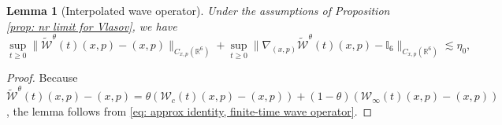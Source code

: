 \documentclass[reqno, 11pt, letterpaper]{amsart}
\newtheorem{lemma}[theorem]{Lemma}
\theoremstyle{remark}
\numberwithin{equation}{section}
\numberwithin{theorem}{section}
\numberwithin{table}{section}
\numberwithin{figure}{section}
\begin{document}
\begin{lemma}[Interpolated wave operator]\label{lemma: interpolated wave operator}
Under the assumptions of Proposition \ref{prop: nr limit for Vlasov}, we have
\begin{equation}\label{eq: interpolated wave operator, almost identity}
\sup_{t\geq0}\big\|\widetilde{\mathcal{W}}^\theta(t)(x,p)-(x,p)\big\|_{C_{x,p}(\mathbb{R}^6)}+\sup_{t\geq0}\big\|\nabla_{(x,p)}\widetilde{\mathcal{W}}^\theta(t)(x,p)-\mathbb{I}_6\big\|_{C_{x,p}(\mathbb{R}^6)}\lesssim\eta_0, 
\end{equation}
\end{lemma}



\begin{proof}
Because 
$\widetilde{\mathcal{W}}^\theta(t)(x,p)-(x,p)=\theta(\mathcal{W}_c(t)(x,p)-(x,p))+(1-\theta)(\mathcal{W}_\infty(t)(x,p)-(x,p))$, the lemma follows from \eqref{eq: approx identity, finite-time wave operator}. 
\end{proof}
\end{document}
